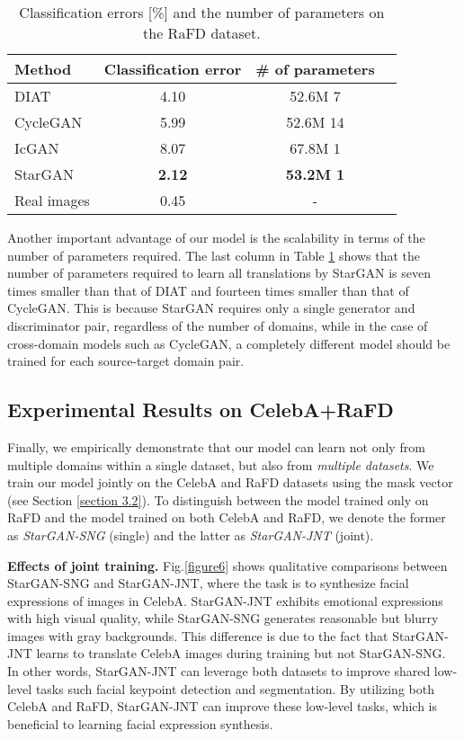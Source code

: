 \documentclass[10pt,twocolumn,letterpaper]{article}
\begin{document}
\begin{table}[ht]
\begin{center}
\begin{tabular}{l c c c}
Method & Classification error & \# of parameters \\
\hline
DIAT & 4.10 & 52.6M  7 \\
CycleGAN & 5.99 & 52.6M  14\\
IcGAN & 8.07 & 67.8M  1\\
StarGAN & \textbf{2.12} & \textbf{53.2M  1} \\
\hline
Real images & 0.45 & - \\
\end{tabular}
\end{center}
\caption{Classification errors [\%] and the number of parameters on the RaFD dataset. 
}
\label{table3}
\end{table}

Another important advantage of our model is the scalability in terms of the number of parameters required. The last column in Table \ref{table3} shows that the number of parameters required to learn all translations by StarGAN is seven times smaller than that of DIAT and fourteen times smaller than that of CycleGAN. This is because StarGAN requires only a single generator and discriminator pair, regardless of the number of domains, while in the case of cross-domain models such as CycleGAN, a completely different model should be trained for each source-target domain pair. 



\subsection{Experimental Results on CelebA+RaFD}



Finally, we empirically demonstrate that our model can learn not only from multiple domains within a single dataset, but also from \textit{multiple datasets}. We train our model jointly on the CelebA and RaFD datasets using the mask vector (see Section \ref{section 3.2}). To distinguish between the model trained only on RaFD and the model trained on both CelebA and RaFD, we denote the former as \textit{StarGAN-SNG} (single) and the latter as \textit{StarGAN-JNT} (joint). 

\smallskip

\noindent\textbf{Effects of joint training.} Fig.\thinspace\ref{figure6} shows qualitative comparisons between StarGAN-SNG and StarGAN-JNT, where the task is to synthesize facial expressions of images in CelebA. StarGAN-JNT exhibits emotional expressions with high visual quality, while StarGAN-SNG generates reasonable but blurry images with gray backgrounds. This difference is due to the fact that StarGAN-JNT learns to translate CelebA images during training but not StarGAN-SNG. In other words, StarGAN-JNT can leverage both datasets to improve shared low-level tasks such facial keypoint detection and segmentation. By utilizing both CelebA and RaFD, StarGAN-JNT can improve these low-level tasks, which is beneficial to learning facial expression synthesis. 
\end{document}
